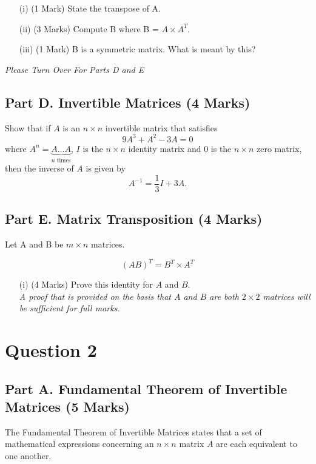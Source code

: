 \documentclass[a4paper,12pt]{article}
\begin{document}
		\begin{itemize}
			\item[(i)] (1 Mark) State the transpose of A.
			\item[(ii)] (3 Marks) Compute B where B = $ A \times A^{T}$. 
			\item[(iii)] (1 Mark) B is a symmetric matrix. What is meant by this?
		\end{itemize}
		\noindent 	\textit{Please Turn Over For Parts D and E}
	\newpage
			\subsection*{Part D. Invertible Matrices (4 Marks)}	
	\noindent	Show that if $A$ is an $n\times n$ invertible matrix that satisfies 
	$$
	9A^3+A^2-3A=0
	$$
	where $A^n=\underbrace{A\ldots A}_{\textrm{$n$ times}}$, %
	$I$ is the $n\times n$  identity matrix and $0$ is the $n\times n$  zero matrix,
	then the inverse of $A$ is given by  %
	$$
	A^{-1}=\frac13I+3A.
	$$
		\smallskip
		\subsection*{Part E. Matrix Transposition (4 Marks)}	
Let A and B be $m \times n$ matrices. 
	
\[	(AB)^{T} = B^T \times A^T\]

\begin{itemize}
\item[(i)] (4 Marks) Prove this identity for $A$ and $B$.\\ \smallskip \textit{A proof that is provided on the basis that $A$ and $B$ are both $2 \times 2$ matrices will be sufficient for full marks.}
\end{itemize}
\newpage
\section*{Question 2}
	\subsection*{Part A. Fundamental Theorem of Invertible Matrices  (5 Marks)}
	The Fundamental Theorem of Invertible Matrices states that a set of mathematical expressions concerning an $n\times n$ matrix $A$ are each equivalent to one another.
	
\end{document}
